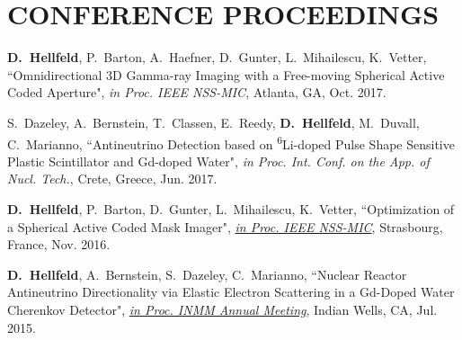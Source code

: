 \section{\small{CONFERENCE PROCEEDINGS}}

 \begin{thebibliography}{3}
 \raggedright
 \vspace{10pt}


 \textbf{D.~Hellfeld}, P.~Barton, A.~Haefner, D.~Gunter, L.~Mihailescu, K.~Vetter, ``Omnidirectional 3D Gamma-ray Imaging with a Free-moving Spherical Active Coded Aperture", \emph{in Proc. IEEE NSS-MIC}, Atlanta, GA, Oct. 2017.


  S.~Dazeley, A.~Bernstein, T.~Classen, E.~Reedy, \textbf{D.~Hellfeld}, M.~Duvall, C.~Marianno, ``Antineutrino Detection based on \textsuperscript{6}Li-doped Pulse Shape Sensitive Plastic Scintillator and Gd-doped Water", \emph{in Proc. Int. Conf. on the App. of Nucl. Tech.}, Crete, Greece, Jun. 2017. 
 
  \textbf{D.~Hellfeld}, P.~Barton, D.~Gunter, L.~Mihailescu, K.~Vetter, ``Optimization of a Spherical Active Coded Mask Imager", \href{http://ieeexplore.ieee.org/document/8069853/}{\emph{in Proc. IEEE NSS-MIC}}, Strasbourg, France, Nov. 2016. 
 
  \textbf{D.~Hellfeld}, A.~Bernstein, S.~Dazeley, C.~Marianno, ``Nuclear Reactor Antineutrino Directionality via Elastic Electron Scattering in a Gd-Doped Water Cherenkov Detector", \href{https://www.inmm.org/INMM-Resources/Proceedings-Presentations/Annual-Meeting-Proceedings}{\emph{in Proc. INMM Annual Meeting}}, Indian Wells, CA, Jul. 2015. 
 
 \end{thebibliography}
